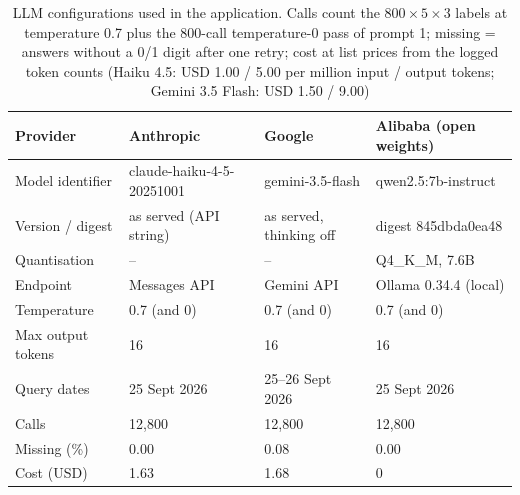 \begin{table}[htbp]
\centering
\footnotesize
\setlength{\tabcolsep}{4pt}
\caption{LLM configurations used in the application. Calls count the $800 \times 5 \times 3$ labels at temperature 0.7 plus the 800-call temperature-0 pass of prompt 1; missing = answers without a 0/1 digit after one retry; cost at list prices from the logged token counts (Haiku 4.5: USD 1.00 / 5.00 per million input / output tokens; Gemini 3.5 Flash: USD 1.50 / 9.00)}\label{tab:providers}
\begin{tabular}{llll}
\toprule
Provider & Anthropic & Google & Alibaba (open weights) \\
\midrule
Model identifier & claude-haiku-4-5-20251001 & gemini-3.5-flash & qwen2.5:7b-instruct \\
Version / digest & as served (API string) & as served, thinking off & digest 845dbda0ea48 \\
Quantisation & -- & -- & Q4\_K\_M, 7.6B \\
Endpoint & Messages API & Gemini API & Ollama 0.34.4 (local) \\
Temperature & 0.7 (and 0) & 0.7 (and 0) & 0.7 (and 0) \\
Max output tokens & 16 & 16 & 16 \\
Query dates & 25 Sept 2026 & 25--26 Sept 2026 & 25 Sept 2026 \\
Calls & 12,800 & 12,800 & 12,800 \\
Missing (\%) & 0.00 & 0.08 & 0.00 \\
Cost (USD) & 1.63 & 1.68 & 0 \\
\bottomrule
\end{tabular}
\end{table}
